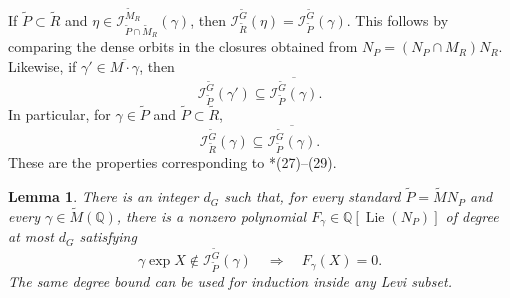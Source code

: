 \documentclass[12pt]{amsart}
\theoremstyle{definition}
\theoremstyle{plain}
\newtheorem{lemma}[definition]{Lemma}
\theoremstyle{remark}
\def\Q{\mathbb{Q}}%
\DeclareMathOperator{\Lie}{Lie}%
\numberwithin{equation}{section}
\newcommand{\tG}{\widetilde{G}}
\newcommand{\tM}{\widetilde{M}}
\newcommand{\tP}{\widetilde{P}}
\newcommand{\tR}{\widetilde{R}}
\begin{document}
If $\tP\subset\tR$
and $\eta\in\mathcal I_{\tP\cap\tM_R}^{\tM_R}(\gamma)$,
then $\mathcal I_{\tR}^{\tG}(\eta) =\mathcal I_{\tP}^{\tG}(\gamma)$.
This follows by comparing the dense orbits in the closures
obtained from $N_P=(N_P\cap M_R)N_R$.
Likewise, if $\gamma'\in\overline{M\cdot\gamma}$, then
\[
 \mathcal I_{\tP}^{\tG}(\gamma')
   \subseteq\overline{\mathcal I_{\tP}^{\tG}(\gamma)}.
\]
In particular, for $\gamma\in\tP$ and $\tP\subset\tR$,
\[
 \mathcal I_{\tR}^{\tG}(\gamma)
   \subseteq\overline{\mathcal I_{\tP}^{\tG}(\gamma)}.
\]
These are the properties corresponding to
\cite{FL16}*{(27)--(29)}.

\begin{lemma}\label{fg:exceptional-polynomial}
There is an integer $d_G$ such that, for every standard
$\tP=\tM N_P$ and every $\gamma\in\tM(\Q)$, there is a
nonzero polynomial $F_\gamma\in\Q[\Lie(N_P)]$ of degree
at most $d_G$ satisfying
\[
 \gamma\exp X\notin\mathcal I_{\tP}^{\tG}(\gamma)
 \quad\Longrightarrow\quad F_\gamma(X)=0.
\]
The same degree bound can be used for induction inside any
Levi subset.
\end{lemma}
\end{document}
